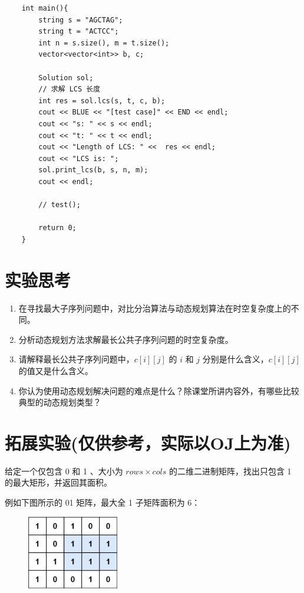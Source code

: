 \documentclass[12pt,a4paper]{article}
\begin{document}
\begin{lstlisting}
    int main(){
        string s = "AGCTAG";
        string t = "ACTCC";
        int n = s.size(), m = t.size();
        vector<vector<int>> b, c;
    
        Solution sol;
        // 求解 LCS 长度
        int res = sol.lcs(s, t, c, b);
        cout << BLUE << "[test case]" << END << endl;
        cout << "s: " << s << endl;
        cout << "t: " << t << endl;
        cout << "Length of LCS: " <<  res << endl;
        cout << "LCS is: ";
        sol.print_lcs(b, s, n, m);
        cout << endl;
    
        // test();
    
        return 0;
    }
\end{lstlisting}




\section{实验思考}

\begin{enumerate}
    \item 在寻找最大子序列问题中，对比分治算法与动态规划算法在时空复杂度上的不同。
    \item 分析动态规划方法求解最长公共子序列问题的时空复杂度。
    \item 请解释最长公共子序列问题中，$c[i][j]$ 的 $i$ 和 $j$ 分别是什么含义，$c[i][j]$ 的值又是什么含义。
    \item 你认为使用动态规划解决问题的难点是什么？除课堂所讲内容外，有哪些比较典型的动态规划类型？
\end{enumerate}

\section{拓展实验(仅供参考，实际以OJ上为准)}

给定一个仅包含 0 和 1 、大小为 $rows \times cols$ 的二维二进制矩阵，找出只包含 1 的最大矩形，并返回其面积。

例如下图所示的 01 矩阵，最大全 1 子矩阵面积为 6：

\begin{figure}[h]
    \centering
    \includegraphics[width=4cm]{img/lab4/maximal.jpg}
\end{figure}
\end{document}
